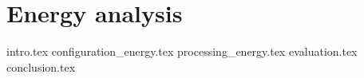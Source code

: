 \chapter{Energy analysis}
\label{ch:6}
{intro.tex}
{configuration_energy.tex}
{processing_energy.tex}
{evaluation.tex}
{conclusion.tex}